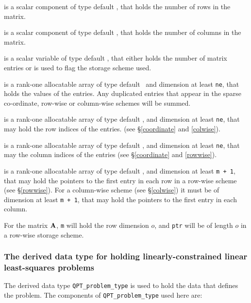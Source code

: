 \documentclass{galahad}
\begin{document}
\begin{description}

 is a scalar component of type default \integer, 
that holds the number of rows in the matrix. 
 
 is a scalar component of type default \integer, 
that holds the number of columns in the matrix. 
 
 is a scalar variable of type default \integer, that either 
holds the number of matrix entries or is used to flag the storage scheme
used. 

 is a rank-one allocatable array of type default \realdp\, 
and dimension at least {\tt ne}, that holds the values of the entries. 
Any duplicated entries that appear in the sparse 
co-ordinate, row-wise or column-wise schemes will be summed. 

 is a rank-one allocatable array of type default \integer, 
and dimension at least {\tt ne}, that may hold the row indices of the entries. 
(see \S\ref{coordinate} and \ref{colwise}).

 is a rank-one allocatable array of type default \integer, 
and dimension at least {\tt ne}, that may the column indices of the entries
(see \S\ref{coordinate} and \ref{rowwise}).

 is a rank-one allocatable array of type default \integer, 
and dimension at least {\tt m + 1}, that may hold the pointers to
the first entry in each row in a row-wise scheme (see \S\ref{rowwise}). 
For a column-wise scheme (see \S\ref{colwise}) it must be of 
dimension at least {\tt m + 1}, that may hold the pointers to
the first entry in each column.

\end{description}
For the matrix ${\mathbf{A}}$, {\tt m} will hold the row dimension $o$, and
{\tt ptr} will be of length $o$ in a row-wise storage scheme.



\subsubsection{The derived data type for holding linearly-constrained linear least-squares problems}
\label{typeqp}

The derived data type 
{\tt QPT\_problem\_type}
is used to hold the data that defines the problem.
The components of 
{\tt QPT\_problem\_type} used here are:
\end{document}
